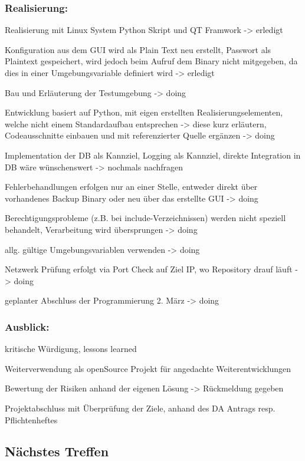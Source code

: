 \documentclass[a4paper,11pt]{article}
\begin{document}
\subsubsection*{Realisierung:}
\label{sec:org340ef25}

Realisierung mit Linux System Python Skript und QT Framwork -> erledigt

Konfiguration aus dem GUI wird als Plain Text neu erstellt, Passwort als
Plaintext gespeichert, wird jedoch beim Aufruf dem Binary nicht mitgegeben,
da dies in einer Umgebungsvariable definiert wird -> erledigt

Bau und Erläuterung der Testumgebung -> doing

Entwicklung basiert auf Python, mit eigen erstellten Realisierungselementen,
welche nicht einem Standardaufbau entsprechen -> diese kurz erläutern,
Codeausschnitte einbauen und mit referenzierter Quelle ergänzen -> doing

Implementation der DB als Kannziel, Logging als Kannziel, direkte
Integration in DB wäre wünschenswert -> nochmals nachfragen

Fehlerbehandlungen erfolgen nur an einer Stelle, entweder direkt über
vorhandenes Backup Binary oder neu über das erstellte GUI -> doing

Berechtigungsprobleme (z.B. bei include-Verzeichnissen) werden nicht
speziell behandelt, Verarbeitung wird übersprungen -> doing

allg. gültige Umgebungsvariablen verwenden -> doing

Netzwerk Prüfung erfolgt via Port Check auf Ziel IP, wo Repository drauf
läuft -> doing

geplanter Abschluss der Programmierung 2. März -> doing

\subsubsection*{Ausblick:}
\label{sec:orge31e851}

kritische Würdigung, lessons learned

Weiterverwendung als openSource Projekt für angedachte Weiterentwicklungen

Bewertung der Risiken anhand der eigenen Lösung -> Rückmeldung gegeben

Projektabschluss mit Überprüfung der Ziele, anhand des DA Antrags resp.
Pflichtenheftes

\subsection*{Nächstes Treffen}
\label{sec:org603308d}
\end{document}
